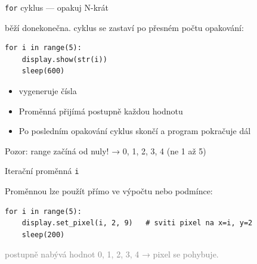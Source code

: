 \begin{frame}[fragile]{\texttt{for} cyklus — opakuj N-krát}

   běží donekonečna.
   cyklus se zastaví po přesném počtu opakování:

  \bigskip
  \begin{lstlisting}
for i in range(5):
    display.show(str(i))
    sleep(600)
  \end{lstlisting}

  \bigskip
  \begin{itemize}
    \item {} vygeneruje čísla 
    \item Proměnná  přijímá postupně každou hodnotu
    \item Po posledním opakování cyklus skončí a program pokračuje dál
  \end{itemize}

  \pause\bigskip
  \begin{alertblock}{Pozor: range začíná od nuly!}
     → 0, 1, 2, 3, 4 \quad (ne 1 až 5)
  \end{alertblock}
\end{frame}

\begin{frame}[fragile]{Iterační proměnná \texttt{i}}

  Proměnnou  lze použít přímo ve výpočtu nebo podmínce:

  \begin{lstlisting}
for i in range(5):
    display.set_pixel(i, 2, 9)   # sviti pixel na x=i, y=2
    sleep(200)
  \end{lstlisting}

  \bigskip
  \begin{center}
  \end{center}

  \textcolor{gray}{\small {} postupně nabývá hodnot 0, 1, 2, 3, 4 → pixel se pohybuje.}
\end{frame}

